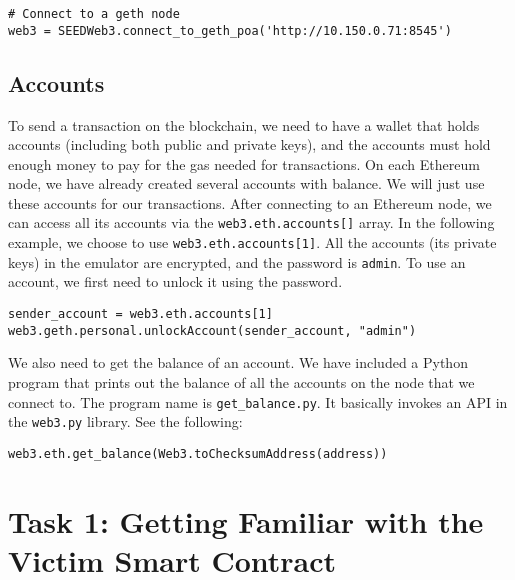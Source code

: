 \begin{lstlisting}
# Connect to a geth node
web3 = SEEDWeb3.connect_to_geth_poa('http://10.150.0.71:8545')
\end{lstlisting}



 

\subsection{Accounts} 

To send a transaction on the blockchain, we need to 
have a wallet that holds accounts (including both public and 
private keys), and the accounts must hold enough money to pay for the gas 
needed for transactions. On each Ethereum node, we have already
created several accounts with balance. We will just use 
these accounts for our transactions. After connecting to
an Ethereum node, we can access all its accounts via
the \texttt{web3.eth.accounts[]} array. In the following 
example, we choose to use \texttt{web3.eth.accounts[1]}. 
All the accounts (its private keys) in the emulator are 
encrypted, and the password is \texttt{admin}. To use 
an account, we first need to unlock it using the password. 

\begin{lstlisting}
sender_account = web3.eth.accounts[1]
web3.geth.personal.unlockAccount(sender_account, "admin")
\end{lstlisting}



We also need to get the balance of an account. We 
have included a Python program that prints out the balance
of all the accounts on the node that we connect to. The 
program name is \texttt{get\_balance.py}. It basically
invokes an API in the \texttt{web3.py} library.  
See the following:

\begin{lstlisting}
web3.eth.get_balance(Web3.toChecksumAddress(address))
\end{lstlisting}
 




\section{Task 1: Getting Familiar with the Victim Smart Contract} 

